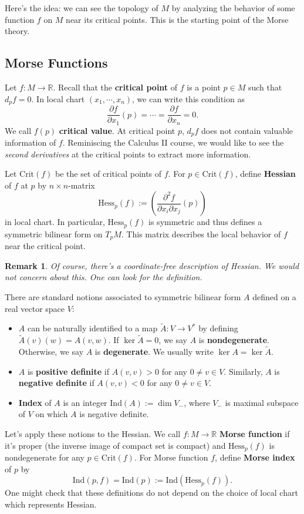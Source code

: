 \documentclass{article}
\newtheorem{remark}[theorem]{Remark}
\newcommand{\R}{\mathbb{R}}
\newcommand{\pp}{\partial}
\newcommand{\Crit}{\mathrm{Crit}}
\newcommand{\Hess}{\mathrm{Hess}}
\newcommand{\Ind}{\mathrm{Ind}}
\begin{document}
Here's the idea: we can see the topology of $M$ by analyzing the behavior of some function $f$ on $M$ near its critical points.
This is the starting point of the Morse theory.

\subsection{Morse Functions}

Let $f:M\to\R$.
Recall that the \textbf{critical point} of $f$ is a point $p\in M$ such that $d_pf=0$.
In local chart $(x_1,\cdots,x_n)$, we can write this condition as
	$$\frac{\pp f}{\pp x_1}(p)=\cdots=\frac{\pp f}{\pp x_n}=0.$$
We call $f(p)$ \textbf{critical value}.
At critical point $p$, $d_p f$ does not contain valuable information of $f$.
Reminiscing the Calculus II course, we would like to see the \emph{second derivatives} at the critical points to extract more information.

Let $\Crit(f)$ be the set of critical points of $f$.
For $p\in\Crit(f)$, define \textbf{Hessian} of $f$ at $p$ by $n\times n$-matrix
	$$\Hess_p(f):=\left(\frac{\pp^2 f}{\pp x_i \pp x_j}(p)\right)$$
in local chart.
In particular, $\Hess_p(f)$ is symmetric and thus defines a symmetric bilinear form on $T_pM$.
This matrix describes the local behavior of $f$ near the critical point.

	\begin{remark}\rm
	Of course, there's a coordinate-free description of Hessian.
	We would not concern about this.
	One can look \cite{m1} for the definition.
	\end{remark}

There are standard notions associated to symmetric bilinear form $A$ defined on a real vector space $V$:
	\begin{itemize}
	\item $A$ can be naturally identified to a map $\tilde{A}:V\to V^*$ by defining $\tilde{A}(v)(w)=A(v,w)$.
	If $\ker\tilde{A}=0$, we say $A$ is \textbf{nondegenerate}.
	Otherwise, we say $A$ is \textbf{degenerate}.
	We usually write $\ker A=\ker\tilde{A}$.
	\item $A$ is \textbf{positive definite} if $A(v,v)>0$ for any $0\neq v\in V$. Similarly, $A$ is \textbf{negative definite} if $A(v,v)<0$ for any $0\neq v\in V$.
	\item \textbf{Index} of $A$ is an integer $\mathrm{Ind}(A):=\dim V_-$, where $V_-$ is maximal subspace of $V$ on which $A$ is negative definite.
	\end{itemize}
Let's apply these notions to the Hessian.
We call $f:M\to\R$ \textbf{Morse function} if it's proper (the inverse image of compact set is compact) and $\Hess_p(f)$ is nondegenerate for any $p\in\Crit(f)$.
For Morse function $f$, define \textbf{Morse index} of $p$ by
	$$\Ind(p,f)=\Ind(p):=\Ind(\Hess_p(f)).$$
One might check that these definitions do not depend on the choice of local chart which represents Hessian.
\end{document}
